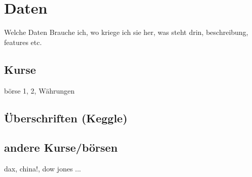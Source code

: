 \chapter{Daten}
Welche Daten Brauche ich, wo kriege ich sie her, was steht drin, beschreibung, features etc.

\section{Kurse}
börse 1, 2, Währungen

\section{Überschriften (Keggle)}

\section{andere Kurse/börsen}
dax, china!, dow jones
...